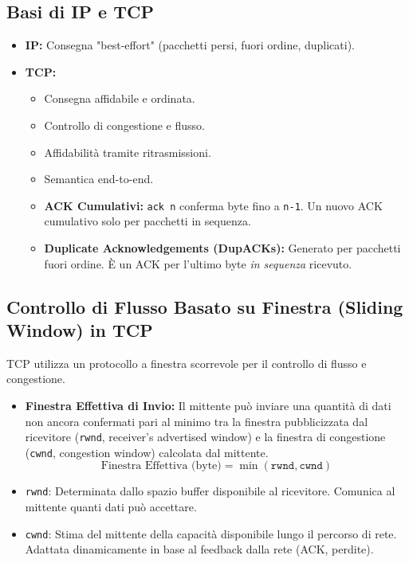 \subsection{Basi di IP e TCP}
\begin{itemize}
    \item \textbf{IP:} Consegna "best-effort" (pacchetti persi, fuori ordine, duplicati).
    \item \textbf{TCP:}
    \begin{itemize}
        \item Consegna affidabile e ordinata.
        \item Controllo di congestione e flusso.
        \item Affidabilità tramite ritrasmissioni.
        \item Semantica end-to-end.
        \item \textbf{ACK Cumulativi:} \texttt{ack n} conferma byte fino a \texttt{n-1}. Un nuovo ACK cumulativo solo per pacchetti in sequenza.
        \item \textbf{Duplicate Acknowledgements (DupACKs):} Generato per pacchetti fuori ordine. È un ACK per l'ultimo byte \textit{in sequenza} ricevuto.
    \end{itemize}
\end{itemize}

\subsection{Controllo di Flusso Basato su Finestra (Sliding Window) in TCP}
TCP utilizza un protocollo a finestra scorrevole per il controllo di flusso e congestione.
\begin{itemize}
    \item \textbf{Finestra Effettiva di Invio:} Il mittente può inviare una quantità di dati non ancora confermati pari al minimo tra la finestra pubblicizzata dal ricevitore (\texttt{rwnd}, receiver's advertised window) e la finestra di congestione (\texttt{cwnd}, congestion window) calcolata dal mittente.
        \[ \text{Finestra Effettiva (byte)} = \min(\texttt{rwnd}, \texttt{cwnd}) \]
    \item \texttt{rwnd}: Determinata dallo spazio buffer disponibile al ricevitore. Comunica al mittente quanti dati può accettare.
    \item \texttt{cwnd}: Stima del mittente della capacità disponibile lungo il percorso di rete. Adattata dinamicamente in base al feedback dalla rete (ACK, perdite).
\end{itemize}

